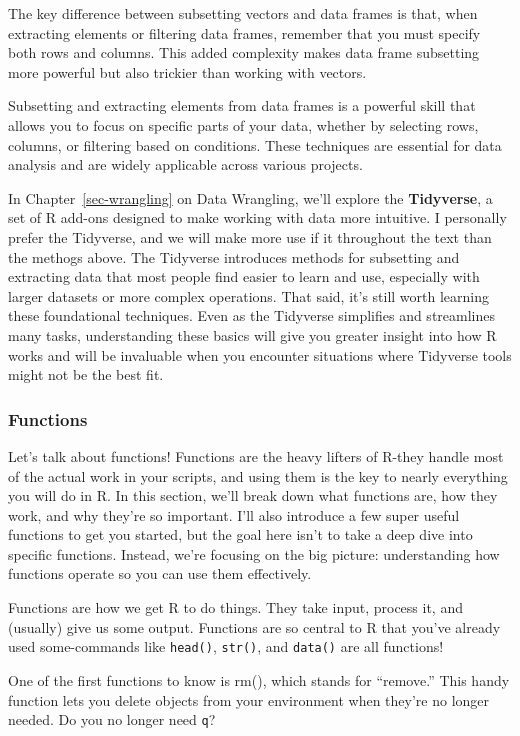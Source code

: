 \documentclass[
  letterpaper,
]{book}
\begin{document}
The key difference between subsetting vectors and data frames is that,
when extracting elements or filtering data frames, remember that you
must specify both rows and columns. This added complexity makes data
frame subsetting more powerful but also trickier than working with
vectors.

Subsetting and extracting elements from data frames is a powerful skill
that allows you to focus on specific parts of your data, whether by
selecting rows, columns, or filtering based on conditions. These
techniques are essential for data analysis and are widely applicable
across various projects.

In Chapter~\ref{sec-wrangling} on Data Wrangling, we'll explore the
\textbf{Tidyverse}, a set of R add-ons designed to make working with
data more intuitive. I personally prefer the Tidyverse, and we will make
more use if it throughout the text than the methogs above. The Tidyverse
introduces methods for subsetting and extracting data that most people
find easier to learn and use, especially with larger datasets or more
complex operations. That said, it's still worth learning these
foundational techniques. Even as the Tidyverse simplifies and
streamlines many tasks, understanding these basics will give you greater
insight into how R works and will be invaluable when you encounter
situations where Tidyverse tools might not be the best fit.

\subsubsection{Functions}\label{functions}

Let's talk about functions! Functions are the heavy lifters of R-they
handle most of the actual work in your scripts, and using them is the
key to nearly everything you will do in R. In this section, we'll break
down what functions are, how they work, and why they're so important.
I'll also introduce a few super useful functions to get you started, but
the goal here isn't to take a deep dive into specific functions.
Instead, we're focusing on the big picture: understanding how functions
operate so you can use them effectively.

Functions are how we get R to do things. They take input, process it,
and (usually) give us some output. Functions are so central to R that
you've already used some-commands like \texttt{head()}, \texttt{str()},
and \texttt{data()} are all functions!

One of the first functions to know is rm(), which stands for ``remove.''
This handy function lets you delete objects from your environment when
they're no longer needed. Do you no longer need \texttt{q}?
\end{document}
